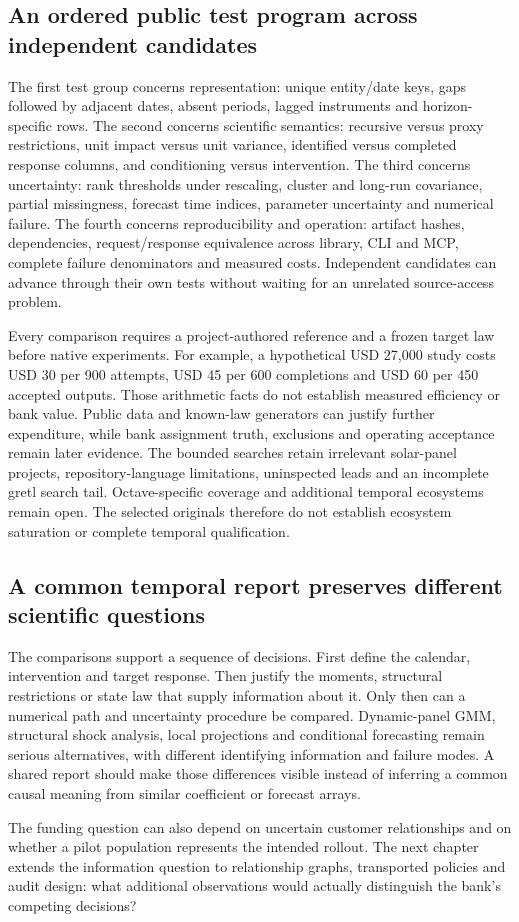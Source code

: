 \subsection{An ordered public test program across independent candidates}

The first test group concerns representation: unique entity/date keys, gaps followed by adjacent dates, absent periods, lagged instruments and horizon-specific rows. The second concerns scientific semantics: recursive versus proxy restrictions, unit impact versus unit variance, identified versus completed response columns, and conditioning versus intervention. The third concerns uncertainty: rank thresholds under rescaling, cluster and long-run covariance, partial missingness, forecast time indices, parameter uncertainty and numerical failure. The fourth concerns reproducibility and operation: artifact hashes, dependencies, request/response equivalence across library, CLI and MCP, complete failure denominators and measured costs. Independent candidates can advance through their own tests without waiting for an unrelated source-access problem.~\citep{exec25_odyn_choice}

Every comparison requires a project-authored reference and a frozen target law before native experiments. For example, a hypothetical USD 27,000 study costs USD 30 per 900 attempts, USD 45 per 600 completions and USD 60 per 450 accepted outputs. Those arithmetic facts do not establish measured efficiency or bank value. Public data and known-law generators can justify further expenditure, while bank assignment truth, exclusions and operating acceptance remain later evidence. The bounded searches retain irrelevant solar-panel projects, repository-language limitations, uninspected leads and an incomplete gretl search tail. Octave-specific coverage and additional temporal ecosystems remain open. The selected originals therefore do not establish ecosystem saturation or complete temporal qualification.~\citep{exec25_odyn_choice}


\subsection{A common temporal report preserves different scientific questions}

The comparisons support a sequence of decisions. First define the calendar,
intervention and target response. Then justify the moments, structural
restrictions or state law that supply information about it. Only then can a
numerical path and uncertainty procedure be compared. Dynamic-panel GMM,
structural shock analysis, local projections and conditional forecasting remain
serious alternatives, with different identifying information and failure modes.
A shared report should make those differences visible instead of inferring a
common causal meaning from similar coefficient or forecast arrays.

The funding question can also depend on uncertain customer relationships and
on whether a pilot population represents the intended rollout. The next chapter
extends the information question to relationship graphs, transported policies
and audit design: what additional observations would actually distinguish the
bank's competing decisions?

